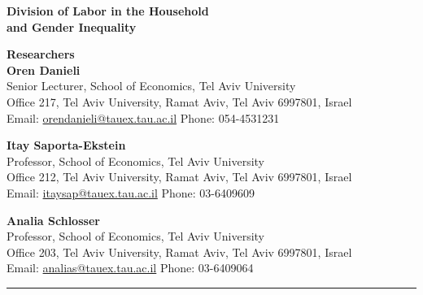 \documentclass[12pt]{article}
\newcommand{\hebrewtitle}{}
\newcommand{\hebrewtitle}{\\[0.25em]\large \texthebrew{חלוקת העבודה במשק הבית ואי שוויון מגדרי}}
\begin{document}
{\Large\bfseries Division of Labor in the Household\\[0.08em]and Gender Inequality\hebrewtitle}

\vspace{0.9em}

\textbf{Researchers}\\
\textbf{Oren Danieli}\\
Senior Lecturer, School of Economics, Tel Aviv University\\
Office 217, Tel Aviv University, Ramat Aviv, Tel Aviv 6997801, Israel\\
Email: \href{mailto:orendanieli@tauex.tau.ac.il}{orendanieli@tauex.tau.ac.il} \quad Phone: 054-4531231

\medskip

\textbf{Itay Saporta-Ekstein}\\
Professor, School of Economics, Tel Aviv University\\
Office 212, Tel Aviv University, Ramat Aviv, Tel Aviv 6997801, Israel\\
Email: \href{mailto:itaysap@tauex.tau.ac.il}{itaysap@tauex.tau.ac.il} \quad Phone: 03-6409609

\medskip

\textbf{Analia Schlosser}\\
Professor, School of Economics, Tel Aviv University\\
Office 203, Tel Aviv University, Ramat Aviv, Tel Aviv 6997801, Israel\\
Email: \href{mailto:analias@tauex.tau.ac.il}{analias@tauex.tau.ac.il} \quad Phone: 03-6409064

\vspace{0.8em}
\hrule
\vspace{0.8em}

\begin{abstract}
Gender gaps in earnings and careers remain a central economic and social problem. A central hypothesis is that the division of labor inside the household is a primary cause of those gaps later in life. This project studies whether temporary shocks to household specialization when children are young, at the beginning of parenthood, can durably change the later division of labor within the household, and whether such changes have causal effects on gender gaps in labor market outcomes. We exploit exogenous variation created by the COVID-19 pandemic, which sharply changed the allocation of paid work and caregiving across couples depending on the pre-pandemic sectors in which mothers and fathers were employed. In some households, mothers continued to work outside the home because they were employed in essential sectors such as health services, banking, or utilities, while fathers stayed home because their sectors were shut down or moved largely to remote work. We study these shocks using linked Israeli administrative data together with panel and time use survey information from the UK Household Longitudinal Study and the German Socio-Economic Panel. We will use a difference-in-differences event study design that determines treatment status based on the pre-COVID sector exposure to COVID regulations. 
\end{abstract}
\end{document}
